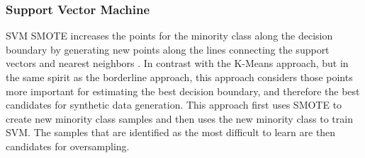 \documentclass[letterpaper, notitlepage]{report}
\begin{document}
\subsubsection{Support Vector Machine}
SVM SMOTE increases the points for the minority class along the decision boundary by generating new points along the lines connecting the support vectors and nearest neighbors \parencite{Nguyen2011-cb}. In contrast with the K-Means approach, but in the same spirit as the borderline approach, this approach considers those points more important for estimating the best decision boundary, and therefore the best candidates for synthetic data generation. This approach first uses SMOTE to create new minority class samples and then uses the new minority class to train SVM. The samples that are identified as the most difficult to learn are then candidates for oversampling.
\end{document}
